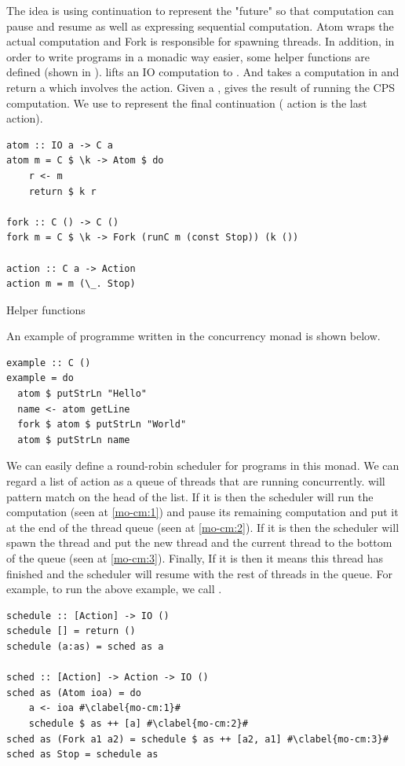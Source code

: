 The idea is using continuation to represent the "future" so that computation can pause and resume as well as expressing sequential computation. Atom wraps the actual computation and Fork is responsible for spawning threads. In addition, in order to write programs in a monadic way easier, some helper functions are defined (shown in ).  lifts an IO computation to . And  takes a computation in  and return a  which involves the  action. Given a ,  gives the result of running the CPS computation. We use  to represent the final continuation ( action is the last action). 
\begin{code}
\begin{verbatim}
atom :: IO a -> C a
atom m = C $ \k -> Atom $ do
    r <- m
    return $ k r

fork :: C () -> C ()
fork m = C $ \k -> Fork (runC m (const Stop)) (k ())

action :: C a -> Action
action m = m (\_. Stop)
\end{verbatim}
\caption{Helper functions}
\label{b:mo:helper}
\end{code}
An example of programme written in the concurrency monad is shown below.
\begin{code}
  \begin{verbatim}
example :: C ()
example = do 
  atom $ putStrLn "Hello" 
  name <- atom getLine 
  fork $ atom $ putStrLn "World"
  atom $ putStrLn name
  \end{verbatim}
\end{code}
We can easily define a round-robin scheduler for programs in this monad. We can regard a list of action as a queue of threads that are running concurrently.  will pattern match on the head of the list. If it is  then the scheduler will run the computation (seen  at \cref{mo-cm:1}) and pause its remaining computation and put it at the end of the thread queue (seen at \cref{mo-cm:2}). If it is  then the scheduler will spawn the thread and put the new thread and the current thread to the bottom of the queue (seen at \cref{mo-cm:3}). Finally, If it is  then it means this thread has finished and the scheduler will resume with the rest of threads in the queue. For example, to run the above example, we call .
\begin{code}
  \begin{verbatim}
schedule :: [Action] -> IO () 
schedule [] = return ()
schedule (a:as) = sched as a

sched :: [Action] -> Action -> IO ()
sched as (Atom ioa) = do
    a <- ioa #\clabel{mo-cm:1}#
    schedule $ as ++ [a] #\clabel{mo-cm:2}#
sched as (Fork a1 a2) = schedule $ as ++ [a2, a1] #\clabel{mo-cm:3}#
sched as Stop = schedule as
  \end{verbatim}
\end{code}

